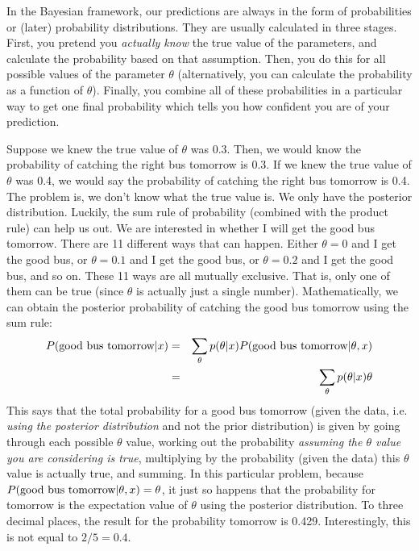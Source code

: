 In the Bayesian framework, our predictions are always in the form of
probabilities or (later) probability distributions. They are usually calculated
in three stages. First, you pretend you {\it actually know} the true value of
the parameters, and calculate the probability based on that assumption. Then,
you do this for all possible values of the parameter $\theta$
(alternatively, you can calculate the probability as a function of $\theta$).
Finally, you combine all of these probabilities in a particular way to get
one final probability which tells you how confident you are of your prediction.

Suppose we knew the true value of $\theta$ was 0.3. Then, we would know
the probability of catching the right bus tomorrow is 0.3. If we knew the
true value of $\theta$ was 0.4, we would say the probability of catching
the right bus tomorrow is 0.4. The problem is, we don't know what the true value
is. We only have the posterior distribution. Luckily, the sum rule of
probability (combined with the product rule) can help us out. We are interested in whether I will get the good
bus tomorrow. There are 11 different ways that can happen. Either $\theta=0$ and
I get the good bus, or $\theta=0.1$ and I get the good bus, or $\theta=0.2$ and
I get the good bus, and so on. These 11 ways are all mutually exclusive. That is,
only one of them can be true (since $\theta$ is actually just a single number).
Mathematically, we can obtain the posterior probability of catching the good
bus tomorrow using the sum rule:
\begin{eqnarray}
P(\textnormal{good bus tomorrow} | x) &=& \sum_{\theta}
p(\theta | x)P(\textnormal{good bus tomorrow} | \theta, x)\\
&=& \sum_{\theta}
p(\theta | x)\theta
\end{eqnarray}
This says that the total probability for a good bus tomorrow (given the data,
i.e. {\it using the posterior distribution} and not the prior distribution)
is given by going through each possible $\theta$ value, working out the probability
{\it assuming the $\theta$ value you are considering is true}, multiplying by the probability
(given the data) this $\theta$ value is actually true, and summing. In this
particular problem, because $P(\textnormal{good bus tomorrow} | \theta, x) = \theta$, it
just so happens that the probability for tomorrow is the expectation value of
$\theta$ using the posterior distribution. To three decimal places, the result
for the probability tomorrow is 0.429. Interestingly, this is not equal to
$2/5 = 0.4$.

